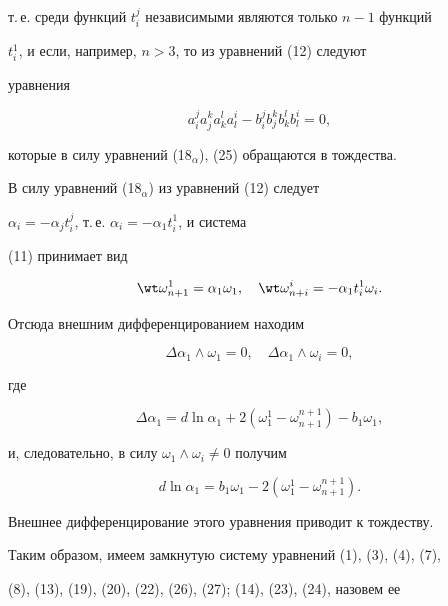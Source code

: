 т.\,е. среди функций $t^j_i$ независимыми являются только $n-1$ функций 


$t^1_i$, и если, например, $n>3$, то из уравнений (12) следуют 


уравнения 


$$ 


a^j_i a^k_j a^l_k a^i_l-b^j_i b^k_j b^l_k b^i_l=0, 


$$ 


которые в силу уравнений (18$_\alpha$), (25) обращаются в тождества. 


 


В силу уравнений (18$_\alpha$) из уравнений (12) следует 


$\alpha_i=-\alpha_j t^j_i$, т.\,е. $\alpha_i=-\alpha_1t^1_i$, и система 


(11) принимает вид 


\begin{equation} 


\wt\omega^1_{n+1}=\alpha_1\omega_1,\quad 


\wt\omega^i_{n+i}=-\alpha_1t^1_i\omega_i. 


\end{equation} 


Отсюда внешним дифференцированием находим 


$$ 


\Delta\alpha_1\wedge\omega_1=0,\quad 


\Delta\alpha_1\wedge\omega_i=0, 


$$ 


где 


$$ 


\Delta\alpha_1=d\ln\alpha_1+2(\omega^1_1-\omega^{n+1}_{n+1}) 


-b_1\omega_1, 


$$ 


и, следовательно, в силу $\omega_1\wedge\omega_i\ne0$ получим 


\begin{equation} 


d\ln\alpha_1=b_1\omega_1-2(\omega^1_1-\omega^{n+1}_{n+1}). 


\end{equation} 


Внешнее дифференцирование этого уравнения приводит к тождеству. 


Таким образом, имеем замк\-ну\-тую систему уравнений (1), (3), (4), (7), 


(8), (13), (19), (20), (22), (26), (27); (14), (23), (24), назовем ее 


